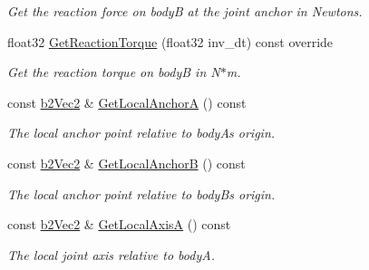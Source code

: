 \begin{DoxyCompactItemize}
\begin{DoxyCompactList}\small\item\em Get the reaction force on bodyB at the joint anchor in Newtons. \end{DoxyCompactList}\item 
\mbox{\label{classb2PrismaticJoint_a009526663c2ad848084103470375dc67}} 
float32 \hyperlink{classb2PrismaticJoint_a009526663c2ad848084103470375dc67}{Get\+Reaction\+Torque} (float32 inv\+\_\+dt) const override
\begin{DoxyCompactList}\small\item\em Get the reaction torque on bodyB in N$\ast$m. \end{DoxyCompactList}\item 
\mbox{\label{classb2PrismaticJoint_a0a4812486867f4c7507bb8c29e860997}} 
const \hyperlink{structb2Vec2}{b2\+Vec2} \& \hyperlink{classb2PrismaticJoint_a0a4812486867f4c7507bb8c29e860997}{Get\+Local\+AnchorA} () const
\begin{DoxyCompactList}\small\item\em The local anchor point relative to bodyA\textquotesingle{}s origin. \end{DoxyCompactList}\item 
\mbox{\label{classb2PrismaticJoint_ab9c2a0fbf075454320e87648750668b0}} 
const \hyperlink{structb2Vec2}{b2\+Vec2} \& \hyperlink{classb2PrismaticJoint_ab9c2a0fbf075454320e87648750668b0}{Get\+Local\+AnchorB} () const
\begin{DoxyCompactList}\small\item\em The local anchor point relative to bodyB\textquotesingle{}s origin. \end{DoxyCompactList}\item 
\mbox{\label{classb2PrismaticJoint_a54d51d09f3c327c5c4238e054e2a3a76}} 
const \hyperlink{structb2Vec2}{b2\+Vec2} \& \hyperlink{classb2PrismaticJoint_a54d51d09f3c327c5c4238e054e2a3a76}{Get\+Local\+AxisA} () const
\begin{DoxyCompactList}\small\item\em The local joint axis relative to bodyA. \end{DoxyCompactList}\item 
\mbox{\label{classb2PrismaticJoint_a7b40d88d1bdb18089803d5abc6ba67c5}} 

\end{DoxyCompactItemize}
